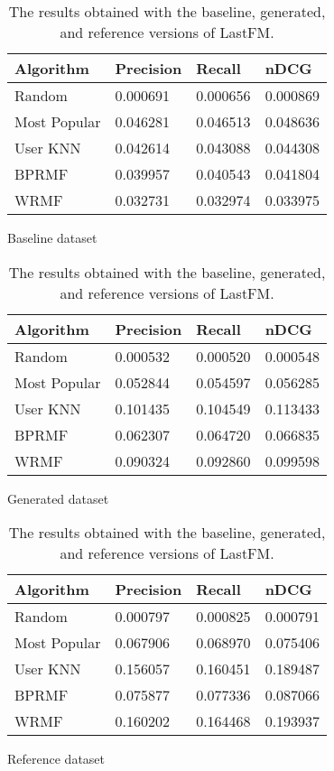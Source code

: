 \begin{table}
\begin{subfigure}{\textwidth}
\centering
\begin{tabular}{@{}llll@{}}
\toprule
Algorithm & Precision & Recall & nDCG \\ \midrule
Random & 0.000691 & 0.000656 & 0.000869 \\
Most Popular & 0.046281 & 0.046513 & 0.048636 \\
User KNN & 0.042614 & 0.043088 & 0.044308 \\
BPRMF & 0.039957 & 0.040543 & 0.041804 \\
WRMF & 0.032731 & 0.032974 & 0.033975 \\ \bottomrule
\end{tabular}
\caption{Baseline dataset}
\bigskip
\end{subfigure}
\begin{subfigure}{\textwidth}
\centering
\begin{tabular}{@{}llll@{}}
\toprule
Algorithm & Precision & Recall & nDCG \\ \midrule
Random & 0.000532 & 0.000520 & 0.000548 \\
Most Popular & 0.052844 & 0.054597 & 0.056285 \\
User KNN & 0.101435 & 0.104549 & 0.113433 \\
BPRMF & 0.062307 & 0.064720 & 0.066835 \\
WRMF & 0.090324 & 0.092860 & 0.099598 \\ \bottomrule
\end{tabular}
\caption{Generated dataset}
\bigskip
\end{subfigure}
\begin{subfigure}{\textwidth}
\centering
\begin{tabular}{@{}llll@{}}
\toprule
Algorithm & Precision & Recall & nDCG \\ \midrule
Random & 0.000797 & 0.000825 & 0.000791 \\
Most Popular & 0.067906 & 0.068970 & 0.075406 \\
User KNN & 0.156057 & 0.160451 & 0.189487 \\
BPRMF & 0.075877 & 0.077336 & 0.087066 \\
WRMF & 0.160202 & 0.164468 & 0.193937 \\ \bottomrule
\end{tabular}
\caption{Reference dataset}
\end{subfigure}
\caption[Experimental results with the synthetic LastFM]{The results obtained with the baseline, generated, and reference versions of LastFM.}
\label{syn:tab:lastfm}
\end{table}

